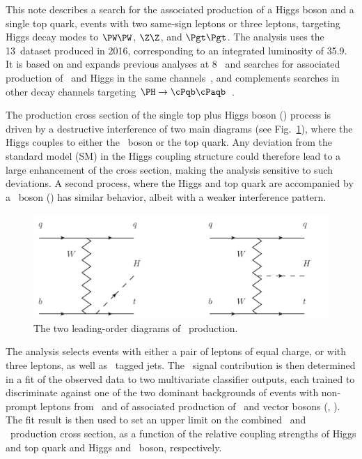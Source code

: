This note describes a search for the associated production of a Higgs boson and a single top quark, events with two same-sign leptons or three leptons, targeting Higgs decay modes to $\PW\PW$, $\Z\Z$, and $\Pgt\Pgt$.
The analysis uses the 13\TeV\ dataset produced in 2016, corresponding to an integrated luminosity of 35.9\fbinv.
It is based on and expands previous analyses at 8\TeV~\cite{Khachatryan:2015ota,CMS_AN_2014-140} and searches for associated production of \ttbar\ and Higgs in the same channels~\cite{CMS_AN_2016-211}, and complements searches in other decay channels targeting $\PH\to\cPqb\cPaqb$~\cite{CMS_PAS_HIG_16-019}.

The production cross section of the single top plus Higgs boson (\tHq) process is driven by a destructive interference of two main diagrams (see Fig.~\ref{fig:thq_prod}), where the Higgs couples to either the \PW\ boson or the top quark.
Any deviation from the standard model (SM) in the Higgs coupling structure could therefore lead to a large enhancement of the cross section, making the analysis sensitive to such deviations.
A second process, where the Higgs and top quark are accompanied by a \PW\ boson (\tHW) has similar behavior, albeit with a weaker interference pattern.

\begin{figure}[!htb]
\begin{center}
\includegraphics[scale=0.7]{figures/qtH.pdf}
\end{center}
\caption{The two leading-order diagrams of \tHq\ production.}
\label{fig:thq_prod}
\end{figure}

The analysis selects events with either a pair of leptons of equal charge, or with three leptons, as well as \cPqb\ tagged jets.
The \tHq\ signal contribution is then determined in a fit of the observed data to two multivariate classifier outputs, each trained to discriminate against one of the two dominant backgrounds of events with non-prompt leptons from \ttbar\ and of associated production of \ttbar\ and vector bosons (\ttW, \ttZ).
The fit result is then used to set an upper limit on the combined \tHq\ and \tHW\ production cross section, as a function of the relative coupling strengths of Higgs and top quark and Higgs and \PW\ boson, respectively.


